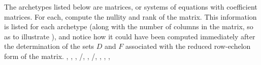 The archetypes listed below are matrices, or systems of equations with coefficient matrices.  For each, compute the nullity and rank of the matrix.  This information is listed for each archetype (along with the number of columns in the matrix, so as to illustrate ), and notice how it could have been computed immediately after the determination of the sets $D$ and $F$ associated with the reduced row-echelon form of the matrix.\newline\newline
{},
,
,
/,
,
/,
,
,
%
,
